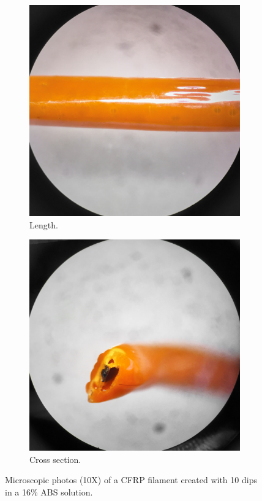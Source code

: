 \begin{figure}[t]
        \centering
        \begin{subfigure}[b]{0.4\linewidth}
                \includegraphics[width=\linewidth]{./figures/filament-108-40-dip-side}
                \caption{Length.}
                \label{fig:filament-108-40-dip-side}
        \end{subfigure}
        \begin{subfigure}[b]{0.4\linewidth}
                \includegraphics[width=\linewidth]{./figures/filament-108-40-dip-end}
                \caption{Cross section.}
                \label{fig:filament-108-40-dip-end}
        \end{subfigure}
        \caption{Microscopic photos (10X) of a CFRP filament created with 10 dips in a 16\% ABS solution.}\label{fig:filament-microscope}
\end{figure}


